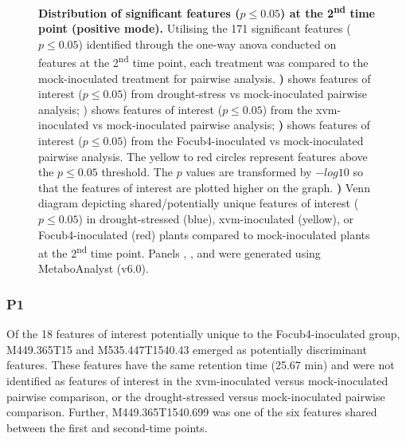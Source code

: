\begin{figure}[hp!]
\begin{subfigure}[b]{0.47\textwidth}
    \caption{}
    \label{fig:PairwiseVenn-SecondTimePoint}
  \end{subfigure}
  \caption[Distribution of significant features at the 2\textsuperscript{nd} time point (positive mode).]{\textbf{Distribution of significant features ($p \le0.05$) at the 2\textsuperscript{nd} time point (positive mode).}
  Utilising the 171 significant features ($p \le0.05$) identified through the one-way \ac{anova} conducted on features at the 2\textsuperscript{nd} time point, each treatment was compared to the mock-inoculated treatment for pairwise analysis.
  \textbf{)} shows features of interest ($p \le0.05$) from drought-stress vs mock-inoculated pairwise analysis;
  \textbf{}) shows features of interest ($p \le0.05$) from the \acl{xvm}-inoculated vs mock-inoculated pairwise analysis; 
  \textbf{)} shows features of interest ($p \le0.05$) from the \acl{Focub4}-inoculated vs mock-inoculated pairwise analysis. The yellow to red circles represent features above the $p \le0.05$ threshold. The $p$ values are transformed by $-log10$ so that the features of interest are plotted higher on the graph.
  \textbf{)} Venn diagram depicting shared/potentially unique features of interest ($p \le0.05$) in drought-stressed (blue), \ac{xvm}-inoculated (yellow), or \ac{Focub4}-inoculated (red) plants compared to mock-inoculated plants at the 2\textsuperscript{nd} time point. 
  Panels , , and  were generated using MetaboAnalyst (v6.0). 
  }
  \label{fig:enter-label}
\end{figure}

\subsubsection{P1}

Of the 18 features of interest potentially unique to the \ac{Focub4}-inoculated group, M449.365T15 and M535.447T1540.43 emerged as potentially discriminant features. These features have the same retention time (25.67 min) and were not identified as features of interest in the \ac{xvm}-inoculated versus mock-inoculated pairwise comparison, or the drought-stressed versus mock-inoculated pairwise comparison. Further, M449.365T1540.699 was one of the six features shared between the first and second-time points. 

